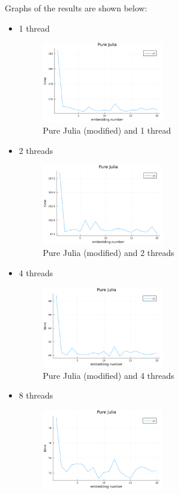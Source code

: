 Graphs of the results are shown below:
\begin{itemize}
    \item 1 thread
    \begin{figure}[H]
        \includegraphics[width=0.5\textwidth]{media/bhembed1.png}
        \caption{Pure Julia (modified) and 1 thread}
    \end{figure}
    \item 2 threads
    \begin{figure}[H]
        \includegraphics[width=0.5\textwidth]{media/bhembed2.png}
        \caption{Pure Julia (modified) and 2 threads}
    \end{figure}
    \item 4 threads
    \begin{figure}[H]
        \includegraphics[width=0.5\textwidth]{media/bhembed4.png}
        \caption{Pure Julia (modified) and 4 threads}
    \end{figure}
    \item 8 threads
    \begin{figure}[H]
        \includegraphics[width=0.5\textwidth]{media/bhembed8.png}

\end{figure}
\end{itemize}
